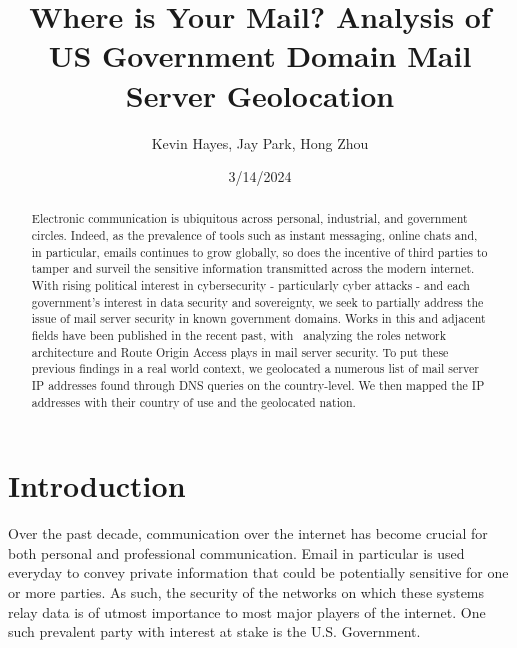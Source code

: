\documentclass{hotnets21}
\begin{document}
\date{3/14/2024}


\title{Where is Your Mail? Analysis of US Government Domain Mail Server Geolocation}

\author{Kevin Hayes, Jay Park, Hong Zhou}

\maketitle

\begin{abstract}

Electronic communication is ubiquitous across personal, industrial, and government circles.
Indeed, as the prevalence of tools such as instant messaging, online chats and, in particular, emails continues to grow globally, so does the incentive of third parties to tamper and surveil the sensitive information transmitted across the modern internet.
With rising political interest in cybersecurity - particularly cyber attacks - and each government’s interest in data security and sovereignty, we seek to partially address the issue of mail server security in known government domains.
Works in this and adjacent fields have been published in the recent past, with~\cite{bartoli} analyzing the roles network architecture and Route Origin Access plays in mail server security.
To put these previous findings in a real world context, we geolocated a numerous list of mail server IP addresses found through DNS queries on the country-level.
We then mapped the IP addresses with their country of use and the geolocated nation.

\end{abstract}

\section{Introduction}

Over the past decade, communication over the internet has become crucial for both personal and professional communication.
Email in particular is used everyday to convey private information that could be potentially sensitive for one or more parties.
As such, the security of the networks on which these systems relay data is of utmost importance to most major players of the internet.
One such prevalent party with interest at stake is the U.S. Government.
\end{document}
